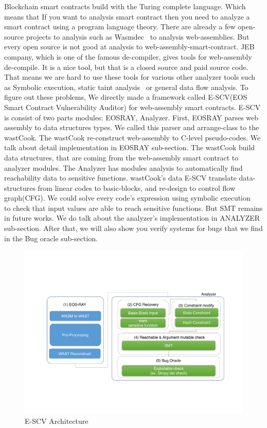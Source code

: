 Blockchain smart contracts build with the Turing complete language. Which means that If you want to analysis smart contract then you need to analyze a smart contract using a program language theory. There are already a few open-source projects to analysis such as  Wasmdec~\cite{wasmdec} to analysis web-assemblies. But every open source is not good at analysis to web-assembly-smart-contract. JEB company, which is one of the famous de-compiler, gives tools for web-assembly de-compile. It is a nice tool, but that is a closed source and paid source code. That means we are hard to use these tools for various other analyzer tools such as Symbolic execution, static taint analysis~\cite{taintAnalysis} or general data flow analysis.
To figure out these problems, We directly made a framework called E-SCV(EOS Smart Contract Vulnerability Auditor) for web-assembly smart contracts. E-SCV is consist of two parts modules: EOSRAY, Analyzer.
First, EOSRAY parses web assembly to data structures types. We called this parser and arrange-class to the wastCook. The wastCook re-construct web-assembly to C-level pseudo-codes. We talk about detail implementation in EOSRAY sub-section. The wastCook build data structures, that are coming from the web-assembly smart contract to analyzer modules. The Analyzer has modules analysis to automatically find reachability data to sensitive functions. wastCook's data E-SCV translate data-structures from linear codes to basic-blocks, and re-design to control flow graph(CFG). We could solve every code's expression using symbolic execution ~\cite{Symbolic_execution} to check that input values are able to reach sensitive functions. But SMT remains in future works. We do talk about the analyzer's implementation in ANALYZER sub-section. After that, we will also show you verify systems for bugs that we find in the Bug oracle sub-section.

\begin{figure}[!h] %
  \centering
  \includegraphics[width=\linewidth]{figures/scalableval.pdf}
  \caption{E-SCV Architecture}

\end{figure} 


